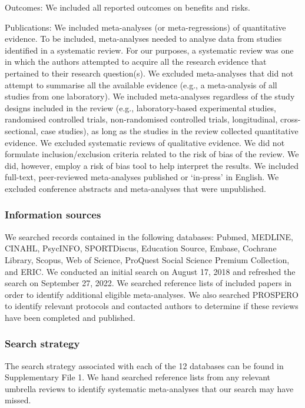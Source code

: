 \documentclass[
  english,
  man]{apa6}
\begin{document}
Outcomes: We included all reported outcomes on benefits and risks.

Publications:
We included meta-analyses (or meta-regressions) of quantitative evidence.
To be included, meta-analyses needed to analyse data from studies identified in a systematic review.
For our purposes, a systematic review was one in which the authors attempted to acquire all the research evidence that pertained to their research question(s).
We excluded meta-analyses that did not attempt to summarise all the available evidence (e.g., a meta-analysis of all studies from one laboratory).
We included meta-analyses regardless of the study designs included in the review (e.g., laboratory-based experimental studies, randomised controlled trials, non-randomised controlled trials, longitudinal, cross-sectional, case studies), as long as the studies in the review collected quantitative evidence.
We excluded systematic reviews of qualitative evidence.
We did not formulate inclusion/exclusion criteria related to the risk of bias of the review.
We did, however, employ a risk of bias tool to help interpret the results.
We included full-text, peer-reviewed meta-analyses published or `in-press' in English.
We excluded conference abstracts and meta-analyses that were unpublished.

\hypertarget{information-sources}{%
\subsubsection{Information sources}\label{information-sources}}

We searched records contained in the following databases: Pubmed, MEDLINE, CINAHL, PsycINFO, SPORTDiscus, Education Source, Embase, Cochrane Library, Scopus, Web of Science, ProQuest Social Science Premium Collection, and ERIC.
We conducted an initial search on August 17, 2018 and refreshed the search on September 27, 2022.
We searched reference lists of included papers in order to identify additional eligible meta-analyses.
We also searched PROSPERO to identify relevant protocols and contacted authors to determine if these reviews have been completed and published.

\hypertarget{search-strategy}{%
\subsubsection{Search strategy}\label{search-strategy}}

The search strategy associated with each of the 12 databases can be found in Supplementary File 1.
We hand searched reference lists from any relevant umbrella reviews to identify systematic meta-analyses that our search may have missed.
\end{document}
